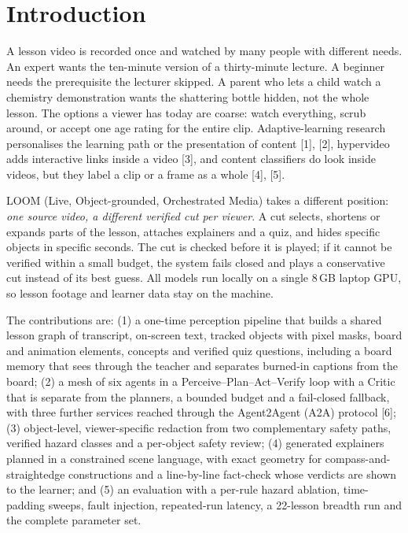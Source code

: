 \documentclass[9pt,a4paper]{extarticle}
\begin{document}
\section{Introduction}
A lesson video is recorded once and watched by many people with different needs. An expert wants the ten-minute version
of a thirty-minute lecture. A beginner needs the prerequisite the lecturer skipped. A parent who lets a child watch a
chemistry demonstration wants the shattering bottle hidden, not the whole lesson. The options a viewer has today are
coarse: watch everything, scrub around, or accept one age rating for the entire clip. Adaptive-learning research
personalises the learning path or the presentation of content [1], [2], hypervideo adds interactive links inside a
video [3], and content classifiers do look inside videos, but they label a clip or a frame as a whole [4], [5].

LOOM (Live, Object-grounded, Orchestrated Media) takes a different position: \emph{one source video, a different
verified cut per viewer}. A cut selects, shortens or expands parts of the lesson, attaches explainers and a quiz, and
hides specific objects in specific seconds. The cut is checked before it is played; if it cannot be verified within a
small budget, the system fails closed and plays a conservative cut instead of its best guess. All models run locally on
a single 8\,GB laptop GPU, so lesson footage and learner data stay on the machine.

The contributions are: (1) a one-time perception pipeline that builds a shared lesson graph of transcript, on-screen
text, tracked objects with pixel masks, board and animation elements, concepts and verified quiz questions, including a
board memory that sees through the teacher and separates burned-in captions from the board; (2) a mesh of six agents in
a Perceive--Plan--Act--Verify loop with a Critic that is separate from the planners, a bounded budget and a fail-closed
fallback, with three further services reached through the Agent2Agent (A2A) protocol [6]; (3) object-level,
viewer-specific redaction from two complementary safety paths, verified hazard classes and a per-object safety review;
(4) generated explainers planned in a constrained scene language, with exact geometry for compass-and-straightedge
constructions and a line-by-line fact-check whose verdicts are shown to the learner; and (5) an evaluation with a
per-rule hazard ablation, time-padding sweeps, fault injection, repeated-run latency, a 22-lesson breadth run and the
complete parameter set.
\end{document}
